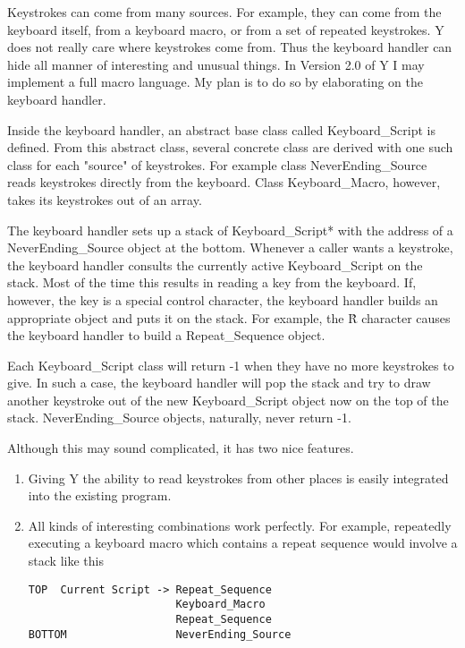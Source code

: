 Keystrokes can come from many sources. For example, they can come from the keyboard itself, from
a keyboard macro, or from a set of repeated keystrokes. Y does not really care where keystrokes
come from. Thus the keyboard handler can hide all manner of interesting and unusual things. In
Version 2.0 of Y I may implement a full macro language. My plan is to do so by elaborating on
the keyboard handler.

Inside the keyboard handler, an abstract base class called Keyboard\_Script is defined. From this
abstract class, several concrete class are derived with one such class for each "source" of
keystrokes. For example class NeverEnding\_Source reads keystrokes directly from the keyboard.
Class Keyboard\_Macro, however, takes its keystrokes out of an array.

The keyboard handler sets up a stack of Keyboard\_Script* with the address of a
NeverEnding\_Source object at the bottom. Whenever a caller wants a keystroke, the keyboard
handler consults the currently active Keyboard\_Script on the stack. Most of the time this
results in reading a key from the keyboard. If, however, the key is a special control character,
the keyboard handler builds an appropriate object and puts it on the stack. For example, the \^R
character causes the keyboard handler to build a Repeat\_Sequence object.

Each Keyboard\_Script class will return -1 when they have no more keystrokes to give. In such a
case, the keyboard handler will pop the stack and try to draw another keystroke out of the new
Keyboard\_Script object now on the top of the stack. NeverEnding\_Source objects, naturally, never
return -1.

Although this may sound complicated, it has two nice features.
\begin{enumerate}
\item Giving Y the ability to read keystrokes from other places is easily integrated into the
  existing program.

\item All kinds of interesting combinations work perfectly. For example, repeatedly executing a
  keyboard macro which contains a repeat sequence would involve a stack like this

\begin{verbatim}
TOP  Current Script -> Repeat_Sequence
                       Keyboard_Macro
                       Repeat_Sequence
BOTTOM                 NeverEnding_Source
\end{verbatim}
\end{enumerate}

